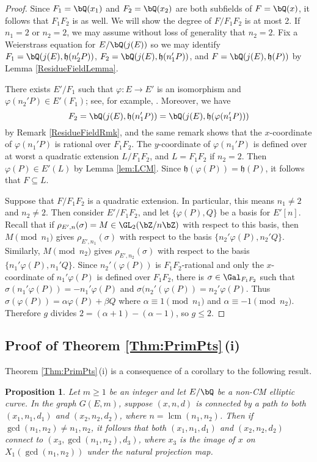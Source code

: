\documentclass[11pt,reqno]{amsart}
\theoremstyle{plain}
\newtheorem{proposition}[theorem]{Proposition}
\theoremstyle{definition}
\DeclareMathOperator{\lcm}{lcm}
\newcommand{\Q}{\bQ}
\newcommand{\Z}{\bZ}
\begin{document}
\begin{proof}
Since $F_1=\Q(x_1)$ and $F_2=\Q(x_2)$ are both subfields of $F=\Q(x)$, it follows that $F_1F_2$ is as well. We will show the degree of $F/F_1F_2$ is at most 2. If $n_1=2$ or $n_2=2$, we may assume without loss of generality that $n_2=2$. Fix a Weierstrass equation for $E/\Q(j(E))$ so we may identify $F_1=\Q(j(E),\mathfrak{h}(n_2'P))$, $F_2=\Q(j(E),\mathfrak{h}(n_1'P))$, and $F=\Q(j(E),\mathfrak{h}(P))$ by Lemma \ref{ResidueFieldLemma}.

There exists $E'/F_1$ such that $\varphi \colon E \rightarrow E'$ is an isomorphism and $\varphi(n_2'P) \in E'(F_1)$; see, for example, \cite[p.~274, Proposition~VI.3.2]{DR}. Moreover, we have 
\[F_2= \Q(j(E),\mathfrak{h}(n_1'P))=\Q(j(E),\mathfrak{h}(\varphi(n_1'P)))\] by Remark \ref{ResidueFieldRmk}, and the same remark shows that the $x$-coordinate of $\varphi(n_1'P)$ is rational over $F_1F_2$. The $y$-coordinate of $\varphi(n_1'P)$ is defined over at worst a quadratic extension $L/F_1F_2$, and $L=F_1F_2$ if $n_2=2$. Then $\varphi(P) \in E'(L)$ by Lemma \ref{lem:LCM}. Since $\mathfrak{h}(\varphi(P))=\mathfrak{h}(P)$, it follows that $F \subseteq L$.

Suppose that $F/F_1F_2$ is a quadratic extension. In particular, this means $n_1 \neq 2$ and $n_2 \neq 2$. Then consider $E'/F_1F_2$, and let $\{\varphi(P),Q\}$ be a basis for $E'[n]$. Recall that if $\rho_{E',n}(\sigma)=M \in \GL_2(\Z/n\Z)$ with respect to this basis, then $M \pmod{n_1}$ gives $\rho_{E',n_1}(\sigma)$ with respect to the basis $\{n_2'\varphi(P),n_2'Q\}$. Similarly, $M\pmod{n_2}$ gives $\rho_{E',n_2}(\sigma)$ with respect to the basis $\{n_1'\varphi(P),n_1'Q\}$.  Since $n_2'(\varphi(P))$ is $F_1F_2$-rational and only the $x$-coordinate of $n_1'\varphi(P)$ is defined over $F_1F_2$, there is $\sigma\in \Gal_{F_1F_2}$ such that $\sigma({n_1'}\varphi(P))={-n_1'}\varphi(P)$ and $\sigma(n_2'(\varphi(P))=n_2'\varphi(P)$. Thus $\sigma(\varphi(P))=\alpha \varphi(P)+\beta Q$ where $\alpha \equiv 1 \pmod{n_1}$ and $\alpha \equiv -1 \pmod{n_2}$. Therefore $g$ divides $2=(\alpha+1)-(\alpha-1)$, so $g\leq 2$.
\end{proof}

\subsection{Proof of Theorem \ref{Thm:PrimPts}\,(i)}
Theorem \ref{Thm:PrimPts}\,(i) is a consequence of a corollary to the following result.

\begin{proposition}\label{Prop:gcd}
Let $m\geq 1$ be an integer and let $E/\Q$ be a non-CM elliptic curve. In the graph $G(E,m)$,
suppose $(x,n,d)$ is connected by a path to both $(x_1,n_1,d_1)$ and $(x_2,n_2,d_2)$, where $n=\lcm(n_1,n_2)$. Then if $\gcd(n_1,n_2) \neq n_1,n_2$, it follows that both $(x_1,n_1,d_1)$ and $(x_2,n_2,d_2)$ connect to $(x_3, \gcd(n_1,n_2),d_3)$, where $x_3$ is the image of $x$ on $X_1(\gcd(n_1,n_2))$ under the natural projection map.

\end{proposition}
\end{document}
